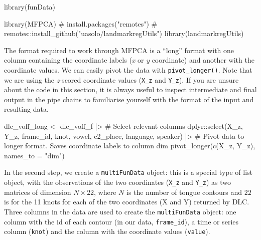 \documentclass[
  man,
  longtable,
  nolmodern,
  notxfonts,
  notimes,
  colorlinks=true,linkcolor=blue,citecolor=blue,urlcolor=blue]{apa7}
\newenvironment{Shaded}{\begin{snugshade}}{\end{snugshade}}
\newcommand{\AttributeTok}[1]{\textcolor[rgb]{0.40,0.45,0.13}{#1}}
\newcommand{\CommentTok}[1]{\textcolor[rgb]{0.37,0.37,0.37}{#1}}
\newcommand{\FunctionTok}[1]{\textcolor[rgb]{0.28,0.35,0.67}{#1}}
\newcommand{\NormalTok}[1]{\textcolor[rgb]{0.00,0.23,0.31}{#1}}
\newcommand{\OtherTok}[1]{\textcolor[rgb]{0.00,0.23,0.31}{#1}}
\newcommand{\SpecialCharTok}[1]{\textcolor[rgb]{0.37,0.37,0.37}{#1}}
\newcommand{\StringTok}[1]{\textcolor[rgb]{0.13,0.47,0.30}{#1}}
\begin{document}
\begin{Shaded}
\begin{Highlighting}[]
\FunctionTok{library}\NormalTok{(funData)}
\end{Highlighting}
\end{Shaded}

\begin{Shaded}
\begin{Highlighting}[]
\FunctionTok{library}\NormalTok{(MFPCA)}
\CommentTok{\# install.packages("remotes")}
\CommentTok{\# remotes::install\_github("uasolo/landmarkregUtils")}
\FunctionTok{library}\NormalTok{(landmarkregUtils)}
\end{Highlighting}
\end{Shaded}

The format required to work through MFPCA is a ``long'' format with one
column containing the coordinate labels (\emph{x} or \emph{y}
coordinate) and another with the coordinate values. We can easily pivot
the data with \texttt{pivot\_longer()}. Note that we are using the
\emph{z}-scored coordinate values (\texttt{X\_z} and \texttt{Y\_z}). If
you are unsure about the code in this section, it is always useful to
inspect intermediate and final output in the pipe chains to familiarise
yourself with the format of the input and resulting data.

\begin{Shaded}
\begin{Highlighting}[]
\NormalTok{dlc\_voff\_long }\OtherTok{\textless{}{-}}\NormalTok{ dlc\_voff\_f }\SpecialCharTok{|\textgreater{}} 
  \CommentTok{\# Select relevant columns}
\NormalTok{  dplyr}\SpecialCharTok{::}\FunctionTok{select}\NormalTok{(X\_z, Y\_z, frame\_id, knot, vowel, c2\_place, language, speaker) }\SpecialCharTok{|\textgreater{}} 
  \CommentTok{\# Pivot data to longer format. Saves coordinate labels to column \textasciigrave{}dim\textasciigrave{}}
  \FunctionTok{pivot\_longer}\NormalTok{(}\FunctionTok{c}\NormalTok{(X\_z, Y\_z), }\AttributeTok{names\_to =} \StringTok{"dim"}\NormalTok{)}
\end{Highlighting}
\end{Shaded}

In the second step, we create a \texttt{multiFunData} object: this is a
special type of list object, with the observations of the two
coordinates (\texttt{X\_z} and \texttt{Y\_z}) as two matrices of
dimension \(N \times 22\), where \(N\) is the number of tongue contours
and \(22\) is for the 11 knots for each of the two coordinates (X and Y)
returned by DLC. Three columns in the data are used to create the
\texttt{multiFunData} object: one column with the id of each contour (in
our data, \texttt{frame\_id}), a time or series column (\texttt{knot})
and the column with the coordinate values (\texttt{value}).
\end{document}
